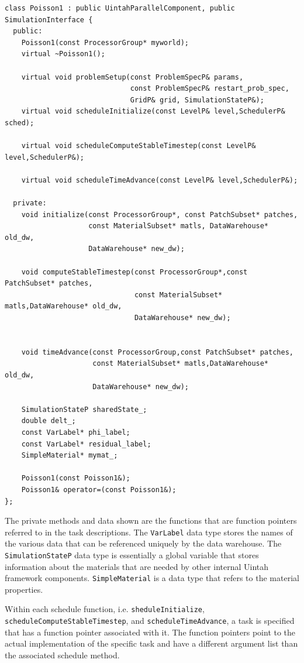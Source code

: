 \documentclass[12pt]{report}
\begin{document}
\begin{Verbatim}[fontsize=\footnotesize]
class Poisson1 : public UintahParallelComponent, public SimulationInterface {
  public:
    Poisson1(const ProcessorGroup* myworld);
    virtual ~Poisson1();

    virtual void problemSetup(const ProblemSpecP& params,
                              const ProblemSpecP& restart_prob_spec,
                              GridP& grid, SimulationStateP&);
    virtual void scheduleInitialize(const LevelP& level,SchedulerP& sched);

    virtual void scheduleComputeStableTimestep(const LevelP& level,SchedulerP&);

    virtual void scheduleTimeAdvance(const LevelP& level,SchedulerP&);

  private:
    void initialize(const ProcessorGroup*, const PatchSubset* patches,
                    const MaterialSubset* matls, DataWarehouse* old_dw,
                    DataWarehouse* new_dw);

    void computeStableTimestep(const ProcessorGroup*,const PatchSubset* patches,
                               const MaterialSubset* matls,DataWarehouse* old_dw,
                               DataWarehouse* new_dw);


    void timeAdvance(const ProcessorGroup,const PatchSubset* patches,
                     const MaterialSubset* matls,DataWarehouse* old_dw,
                     DataWarehouse* new_dw);

    SimulationStateP sharedState_;
    double delt_;
    const VarLabel* phi_label;
    const VarLabel* residual_label;
    SimpleMaterial* mymat_;

    Poisson1(const Poisson1&);
    Poisson1& operator=(const Poisson1&);
};
\end{Verbatim}

The private methods and data shown are the functions that are function
pointers referred to in the task descriptions.  The \texttt{VarLabel}
data type stores the names of the various data that can be referenced
uniquely by the data warehouse.  The \texttt{SimulationStateP} data
type is essentially a global variable that stores information about
the materials that are needed by other internal Uintah framework
components.  \texttt{SimpleMaterial} is a data type that refers to the
material properties.

Within each schedule function, i.e. \texttt{sheduleInitialize},
\texttt{scheduleComputeStableTimestep}, and
\texttt{scheduleTimeAdvance}, a task is specified that has a function
pointer associated with it.  The function pointers point to the actual
implementation of the specific task and have a different argument list
than the associated schedule method.
\end{document}
